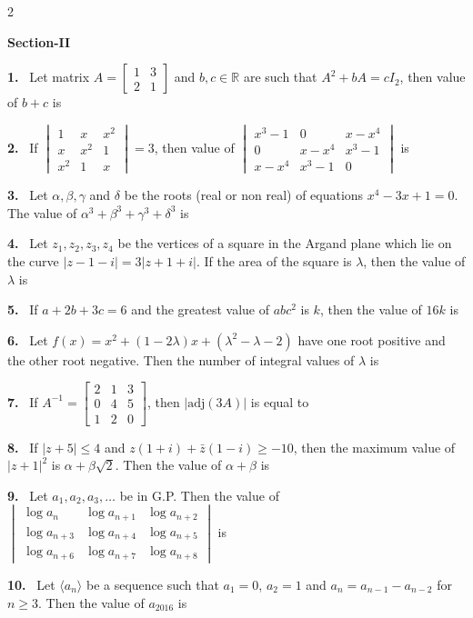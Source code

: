\documentclass[10pt]{extarticle}
\newcommand{\sect}[1]{\par\smallskip\noindent\textbf{#1}\par}
\newcommand{\qn}[1]{\par\smallskip\noindent\textbf{#1.}~}
\begin{document}
\begin{multicols}{2}
\sect{Section-II}
\qn{1} Let matrix $A=\begin{bmatrix}1&3\\2&1\end{bmatrix}$ and $b,c\in\mathbb R$ are such that $A^2+bA=cI_2$, then value of $b+c$ is
\qn{2} If $\begin{vmatrix}1&x&x^2\\x&x^2&1\\x^2&1&x\end{vmatrix}=3$, then value of $\begin{vmatrix}x^3-1&0&x-x^4\\0&x-x^4&x^3-1\\x-x^4&x^3-1&0\end{vmatrix}$ is
\qn{3} Let $\alpha,\beta,\gamma$ and $\delta$ be the roots (real or non real) of equations $x^4-3x+1=0$. The value of $\alpha^3+\beta^3+\gamma^3+\delta^3$ is
\qn{4} Let $z_1,z_2,z_3,z_4$ be the vertices of a square in the Argand plane which lie on the curve $|z-1-i|=3|z+1+i|$. If the area of the square is $\lambda$, then the value of $\lambda$ is
\qn{5} If $a+2b+3c=6$ and the greatest value of $abc^2$ is $k$, then the value of $16k$ is
\qn{6} Let $f(x)=x^2+(1-2\lambda)x+(\lambda^2-\lambda-2)$ have one root positive and the other root negative. Then the number of integral values of $\lambda$ is
\qn{7} If $A^{-1}=\begin{bmatrix}2&1&3\\0&4&5\\1&2&0\end{bmatrix}$, then $\left|\mathrm{adj}(3A)\right|$ is equal to
\qn{8} If $|z+5|\le4$ and $z(1+i)+\bar z(1-i)\ge-10$, then the maximum value of $|z+1|^2$ is $\alpha+\beta\sqrt2$. Then the value of $\alpha+\beta$ is
\qn{9} Let $a_1,a_2,a_3,\ldots$ be in G.P. Then the value of $\begin{vmatrix}\log a_n&\log a_{n+1}&\log a_{n+2}\\\log a_{n+3}&\log a_{n+4}&\log a_{n+5}\\\log a_{n+6}&\log a_{n+7}&\log a_{n+8}\end{vmatrix}$ is
\qn{10} Let $\langle a_n\rangle$ be a sequence such that $a_1=0$, $a_2=1$ and $a_n=a_{n-1}-a_{n-2}$ for $n\ge3$. Then the value of $a_{2016}$ is
\end{multicols}
\end{document}
